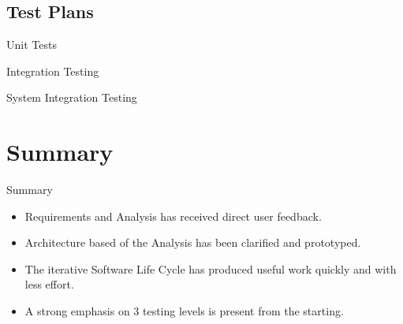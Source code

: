\documentclass{beamer}
\begin{document}
\subsection{ Test Plans}
\begin{frame}{Unit Tests}
\end{frame}
\begin{frame}{Integration Testing}
\end{frame}
\begin{frame}{System Integration Testing}
\end{frame}





\section*{Summary}

\begin{frame}{Summary}

  \begin{itemize}
  \item
    Requirements and Analysis has received direct user feedback.
  \item
    Architecture based of the Analysis has been clarified and prototyped. 
  \item 
	The iterative Software Life Cycle has produced useful work quickly and with less effort.
  \item
    A strong emphasis on 3 testing levels is present from the starting.
  \end{itemize}
 \end{frame}
\end{document}
